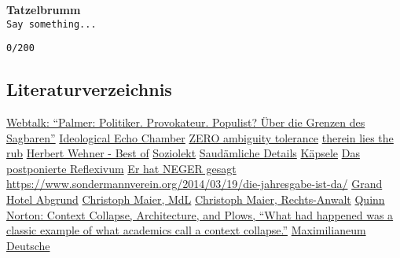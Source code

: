 \documentclass[]{article}
\begin{document}
\textbf{Tatzelbrumm}\\
\texttt{Say\ something...}

\texttt{0/200}

\subsection{Literaturverzeichnis}\label{literaturverzeichnis}

\begin{thebibliography}{11}
  \href{https://youtu.be/SqAqg0ZIrhM}{Webtalk: ``Palmer: Politiker.
  Provokateur. Populist? Über die Grenzen des Sagbaren''}
  \href{https://en.wikipedia.org/wiki/Google\%27s_Ideological_Echo_Chamber}{Ideological
  Echo Chamber}
  \href{https://en.wikipedia.org/wiki/Ambiguity_tolerance\%E2\%80\%93intolerance}{ZERO
  ambiguity tolerance}
  \href{https://en.wiktionary.org/wiki/therein_lies_the_rub}{therein
  lies the rub}
  \href{https://youtu.be/01OgjnWvpI8}{Herbert Wehner - Best of}
  \href{https://de.wikipedia.org/wiki/Soziolekt}{Soziolekt}
  \href{https://www.spiegel.de/politik/saudaemliche-details-a-b4b5580e-0002-0001-0000-000045144001}{Saudämliche
  Details}
  \href{http://www.schwaebisches-woerterbuch.de/default.asp?q=K\%E4psale}{Käpsele}
  \href{http://www.zweitgeist.net/2010/01/das-postponierte-reflexivum/}{Das
  postponierte Reflexivum}
  \href{https://youtu.be/Z67IGJz_kCI}{Er hat NEGER gesagt}
  \url{https://www.sondermannverein.org/2014/03/19/die-jahresgabe-ist-da/}
  \href{https://www.zeit.de/2019/48/grand-hotel-abgrund-frankfurter-schule-stuart-jeffries}{Grand
  Hotel Abgrund}
  \href{https://www.bayern.landtag.de/abgeordnete/abgeordnete-von-a-z/profil/christoph-maier/}{Christoph
  Maier, MdL}
  \href{https://www.ra-cm.de/christoph-maier-rechtsanwalt}{Christoph
  Maier, Rechts-Anwalt}
  \href{https://medium.com/message/context-collapse-architecture-and-plows-d23a0d2f7697#418c}{Quinn Norton: Context Collapse, Architecture, and Plows, 
``What had happened was a classic example of what academics call a context collapse.''}
  \href{https://www.bayern.landtag.de/maximilianeum/landtagsgebaeude/}{Maximilianeum}
  \href{https://www.augsburger-allgemeine.de/mindelheim/Unterallgaeu-Deutschlandlied-gesungen-AfD-Politiker-Maier-verteidigt-sich-id54274826.html}{Deutsche
}
\end{thebibliography}
\end{document}
